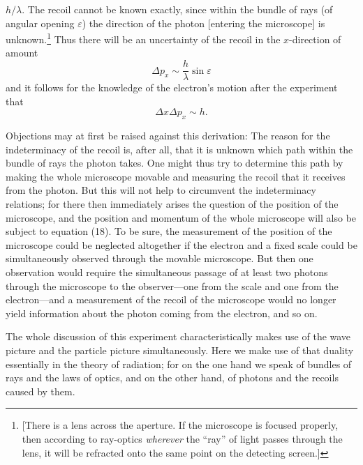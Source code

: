 $h/\lambda$. The recoil cannot be known exactly, since within the bundle
of rays (of angular opening $\varepsilon$) the direction of the photon
{[}entering the microscope{]} is unknown.\footnote{{[}There is a lens
  across the aperture. If the microscope is focused properly, then
  according to ray-optics \emph{wherever} the ``ray'' of light passes
  through the lens, it will be refracted onto the same point on the
  detecting screen.{]}} Thus there will be an uncertainty of the recoil
in the $x$-direction of amount
%
\begin{equation*}\tag{17}
\Delta p_x \sim \frac{h}{\lambda}\sin \varepsilon %
\end{equation*}
%
and it follows for the knowledge of the electron's motion after the
experiment that
%
\begin{equation*}\tag{18}
\Delta x\Delta p_x \sim h. %
\end{equation*}
%

Objections may at first be raised against this derivation: The reason
for the indeterminacy of the recoil is, after all, that it is unknown
which path within the bundle of rays the photon takes. One might thus
try to determine this path by making the whole microscope movable and
measuring the recoil that it receives from the photon. But this will not
help to circumvent the indeterminacy relations; for there then
immediately arises the question of the position of the microscope, and
the position and momentum of the whole microscope will also be subject
to equation (18). To be sure, the measurement of the position of the
microscope could be neglected altogether if the electron and a fixed
scale could be simultaneously observed through the movable microscope.
But then one observation would require the simultaneous passage of at
least two photons through the microscope to the observer---one from the
scale and one from the electron---and a measurement of the recoil of the
microscope would no longer yield information about the photon coming
from the electron, and so on.

The whole discussion of this experiment characteristically makes use of
the wave picture and the particle picture simultaneously. Here we make
use of that duality essentially in the theory of radiation; for on the
one hand we speak of bundles of rays and the laws of optics, and on the
other hand, of photons and the recoils caused by them.

